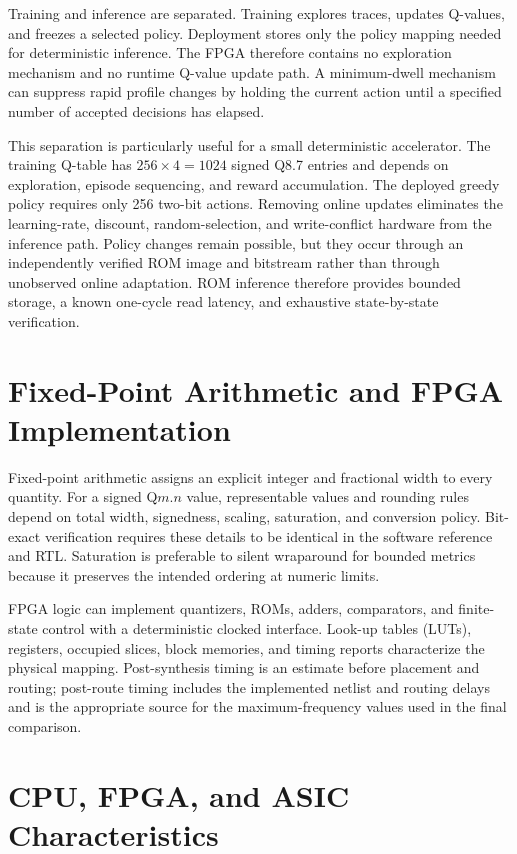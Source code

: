 Training and inference are separated. Training explores traces, updates Q-values,
and freezes a selected policy. Deployment stores only the policy mapping needed for
deterministic inference. The FPGA therefore contains no exploration mechanism and no
runtime Q-value update path. A minimum-dwell mechanism can suppress rapid profile
changes by holding the current action until a specified number of accepted decisions
has elapsed.

This separation is particularly useful for a small deterministic accelerator. The
training Q-table has $256\times4=1024$ signed Q8.7 entries and depends on exploration,
episode sequencing, and reward accumulation. The deployed greedy policy requires
only 256 two-bit actions. Removing online updates eliminates the learning-rate,
discount, random-selection, and write-conflict hardware from the inference path.
Policy changes remain possible, but they occur through an independently verified ROM
image and bitstream rather than through unobserved online adaptation. ROM inference
therefore provides bounded storage, a known one-cycle read latency, and exhaustive
state-by-state verification.

\section{Fixed-Point Arithmetic and FPGA Implementation}

Fixed-point arithmetic assigns an explicit integer and fractional width to every
quantity. For a signed Q$m.n$ value, representable values and rounding rules depend
on total width, signedness, scaling, saturation, and conversion policy. Bit-exact
verification requires these details to be identical in the software reference and
RTL. Saturation is preferable to silent wraparound for bounded metrics because it
preserves the intended ordering at numeric limits.

FPGA logic can implement quantizers, ROMs, adders, comparators, and finite-state
control with a deterministic clocked interface. Look-up tables (LUTs), registers,
occupied slices, block memories, and timing reports characterize the physical
mapping. Post-synthesis timing is an estimate before placement and routing;
post-route timing includes the implemented netlist and routing delays and is the
appropriate source for the maximum-frequency values used in the final comparison.

\section{CPU, FPGA, and ASIC Characteristics}

